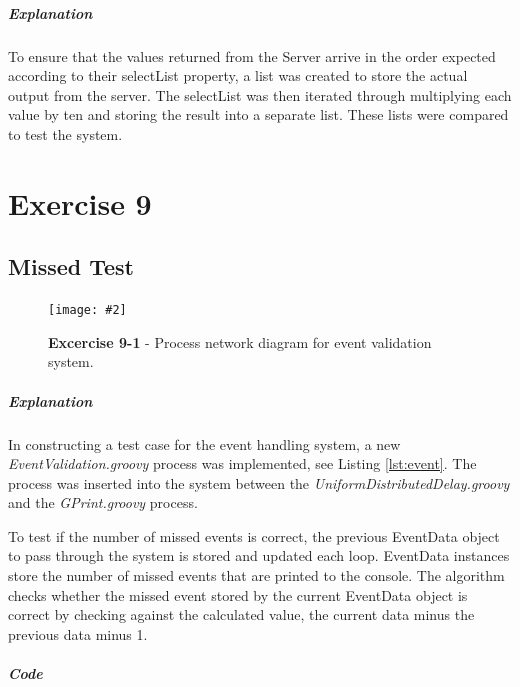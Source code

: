 \documentclass[10pt, a4paper]{article}
\newcommand{\figuremacro}[5]{
    \begin{figure}[#1]
        \centering
        \texttt{[image: \#2]}
        \caption[#3]{\textbf{#3}#4}
        \label{fig:#2}
    \end{figure}
}
\begin{document}
   \subparagraph{Explanation}
   
   To ensure that the values returned from the Server arrive in the order expected according to their selectList property, a list was created to store the actual output from the server. The selectList was then iterated through multiplying each value by ten and storing the result into a separate list. These lists were compared to test the system.
   
   \setcounter{section}{9}
   \section*{Exercise 9}
   
   \setcounter{subsection}{0}
   \subsection{Missed Test}
   
   \figuremacro{H}{evalid}{Excercise 9-1}{ -  Process network diagram for event validation system.}{1.0}

   \subparagraph{Explanation}
   
   In constructing a test case for the event handling system, a new \textit{EventValidation.groovy} process was implemented, see Listing \ref{lst:event}. The process was inserted into the system between the \textit{UniformDistributedDelay.groovy} and the \textit{GPrint.groovy} process.
   
   To test if the number of missed events is correct, the previous EventData object to pass through the system is stored and updated each loop. EventData instances store the number of missed events that are printed to the console. The algorithm checks whether the missed event stored by the current EventData object is correct by checking against the calculated value, the current data minus the previous data minus 1.
   
   \subparagraph{Code} \hfill
   
\end{document}

